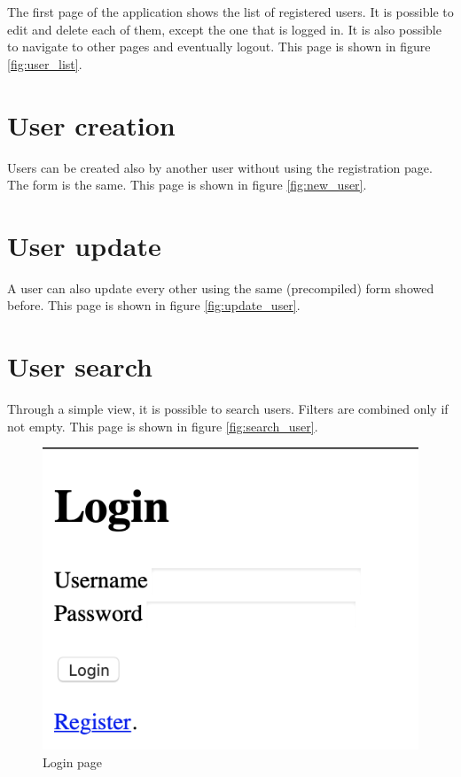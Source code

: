 \documentclass[a4paper]{report}
\begin{document}
	The first page of the application shows the list of registered users. It is possible to edit and delete each of them, except the one that is logged in. It is also possible to navigate to other pages and eventually logout. This page is shown in figure \ref{fig:user_list}.
	
	\section{User creation}
	\label{sec:user_creation}
	
	Users can be created also by another user without using the registration page. The form is the same. This page is shown in figure \ref{fig:new_user}.
	
	\section{User update}
	\label{sec:user_update}
	
	A user can also update every other using the same (precompiled) form showed before. This page is shown in figure \ref{fig:update_user}.
	
	\section{User search}
	\label{sec:user_search}
	
	Through a simple view, it is possible to search users. Filters are combined only if not empty. This page is shown in figure \ref{fig:search_user}.
	
	\begin{figure}[ht]
		\centering
		\includegraphics[scale=0.7]{images/login.png}
		\caption{Login page}
		\label{fig:login}
	\end{figure} 
	
\end{document}
